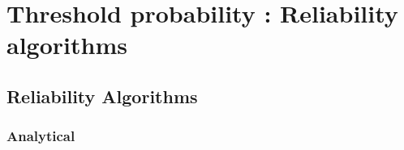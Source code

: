 \newpage\section{Threshold  probability : Reliability algorithms}



\subsection{Reliability Algorithms}

\subsubsection{Analytical}

